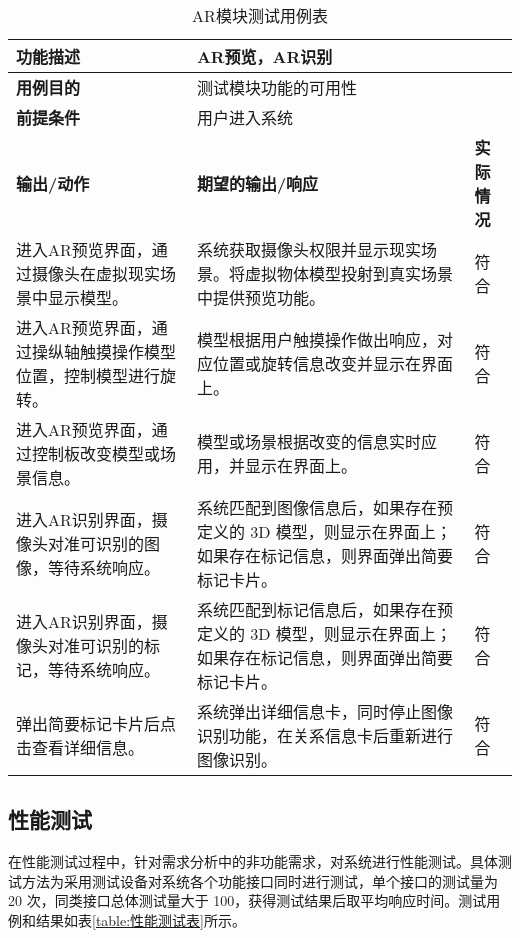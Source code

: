\begin{table}[H]
  \centering
  \small
  \renewcommand\arraystretch{1.1}
  \caption{AR模块测试用例表}
  \label{table:AR模块测试用例表}
  \setlength{\tabcolsep}{4mm}
  \begin{tabular}{|p{4.5cm}|p{6.5cm}|p{1.5cm}|}
    \hline \textbf{功能描述} & \multicolumn{2}{l|}{AR预览，AR识别} \\
    \hline \textbf{用例目的} & \multicolumn{2}{l|}{测试模块功能的可用性} \\
    \hline \textbf{前提条件} & \multicolumn{2}{l|}{用户进入系统} \\
    \hline \textbf{输出/动作} & \textbf{期望的输出/响应} & \textbf{实际情况} \\
    \hline 进入AR预览界面，通过摄像头在虚拟现实场景中显示模型。 & 系统获取摄像头权限并显示现实场景。将虚拟物体模型投射到真实场景中提供预览功能。 & 符合  \\
    \hline 进入AR预览界面，通过操纵轴触摸操作模型位置，控制模型进行旋转。 & 模型根据用户触摸操作做出响应，对应位置或旋转信息改变并显示在界面上。 & 符合  \\
    \hline 进入AR预览界面，通过控制板改变模型或场景信息。 & 模型或场景根据改变的信息实时应用，并显示在界面上。 & 符合  \\
    \hline 进入AR识别界面，摄像头对准可识别的图像，等待系统响应。 & 系统匹配到图像信息后，如果存在预定义的 3D 模型，则显示在界面上；如果存在标记信息，则界面弹出简要标记卡片。 & 符合  \\
    \hline 进入AR识别界面，摄像头对准可识别的标记，等待系统响应。 & 系统匹配到标记信息后，如果存在预定义的 3D 模型，则显示在界面上；如果存在标记信息，则界面弹出简要标记卡片。 & 符合  \\
    \hline 弹出简要标记卡片后点击查看详细信息。 & 系统弹出详细信息卡，同时停止图像识别功能，在关系信息卡后重新进行图像识别。 & 符合  \\
    \hline
  \end{tabular}
\end{table}

\subsection{性能测试}

在性能测试过程中，针对需求分析中的非功能需求，对系统进行性能测试。具体测试方法为采用测试设备对系统各个功能接口同时进行测试，单个接口的测试量为 20 次，同类接口总体测试量大于 100，获得测试结果后取平均响应时间。测试用例和结果如表\ref{table:性能测试表}所示。

